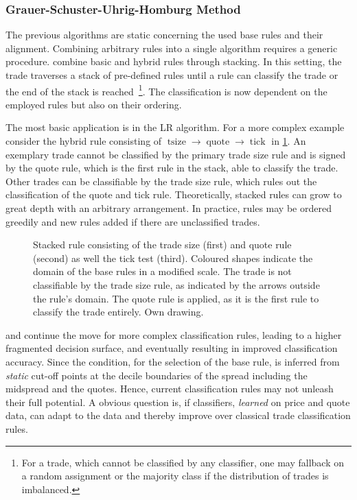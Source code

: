 \subsubsection{Grauer-Schuster-Uhrig-Homburg Method}\label{sec:stacked-rule}

The previous algorithms are static concerning the used base rules and their alignment. Combining arbitrary rules into a single algorithm requires a generic procedure. \textcite[][18]{grauerOptionTradeClassification2022} combine basic and hybrid rules through stacking. In this setting, the trade traverses a stack of pre-defined rules until a rule can classify the trade or the end of the stack is reached~\footnote{For a trade, which cannot be classified by any classifier, one may fallback on a random assignment or the majority class if the distribution of trades is imbalanced.}. The classification is now dependent on the employed rules but also on their ordering.

The most basic application is in the \gls{LR} algorithm. For a more complex example consider the hybrid rule consisting of $\operatorname{tsize} \to \operatorname{quote} \to \operatorname{tick}$ in \cref{fig:stacking-algo}. An exemplary trade cannot be classified by the primary trade size rule and is signed by the quote rule, which is the first rule in the stack, able to classify the trade. Other trades can be classifiable by the trade size rule, which rules out the classification of the quote and tick rule. Theoretically, stacked rules can grow to great depth with an arbitrary arrangement. In practice, rules may be ordered greedily and new rules added if there are unclassified trades.

\begin{figure}[ht!]
    \centering
    
    \caption[Stacked Trade Classification Rules]{Stacked rule consisting of the trade size (first) and quote rule (second) as well the tick test (third). Coloured shapes indicate the domain of the base rules in a modified scale. The trade is not classifiable by the trade size rule, as indicated by the arrows outside the rule's domain. The quote rule is applied, as it is the first rule to classify the trade entirely. Own drawing.}
    \label{fig:stacking-algo}
\end{figure}

\textcite[][3811]{chakrabartyTradeClassificationAlgorithms2007} and \textcite[][18]{grauerOptionTradeClassification2022} continue the move for more complex classification rules, leading to a higher fragmented decision surface, and eventually resulting in improved classification accuracy. Since the condition, for the selection of the base rule, is inferred from \emph{static} cut-off points at the decile boundaries of the spread including the midspread and the quotes. Hence, current classification rules may not unleash their full potential. A obvious question is, if classifiers, \emph{learned} on price and quote data, can adapt to the data and thereby improve over classical trade classification rules.

